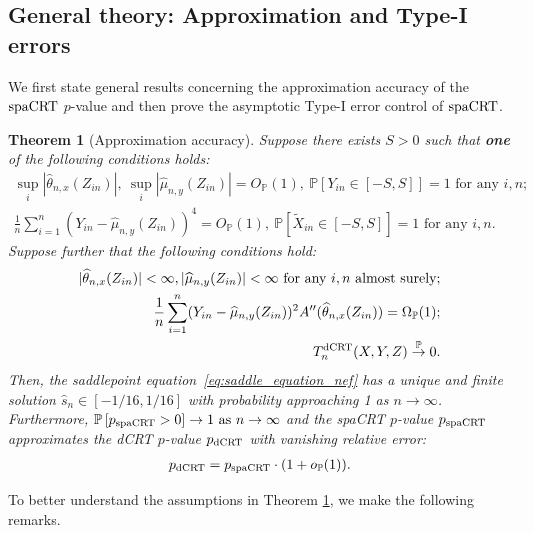 \documentclass[12pt]{article}
\newtheorem{theorem}{Theorem}
\theoremstyle{definition}
\def\P{\mathbb{P}}
\def\P{\mathbb{P}}
\renewcommand{\P}{\mathbb{P}}							%
\newcommand{\convp}{\overset{\mathbb{P}}{\rightarrow}}             %
\newcommand{\srx}{X}									%
\newcommand{\srz}{Z}									%
\newcommand{\srxk}{\widetilde X}						%
\newcommand{\sry}{Y}									%
\newcommand{\dCRT}{\textnormal{dCRT}} 					%
\newcommand{\spacrt}{\textnormal{spaCRT}}               %
\begin{document}
  \subsection{General theory: Approximation and Type-I errors} \label{sec:spacrt-general-theory}
  
  We first state general results concerning the approximation accuracy of the $\spacrt$ $p$-value and then prove the asymptotic Type-I error control of $\spacrt$.
  
  \begin{theorem}[Approximation accuracy]\label{thm:validity_spacrt}
	Suppose there exists $S>0$ such that \textbf{one} of the following conditions holds:
	\begin{align}
	  \sup_{i}|\widehat{\theta}_{n,x}(\srz_{in})|,\ \sup_{i}|\widehat{\mu}_{n,y}(\srz_{in})| = O_{\P}(1),\  \P[\sry_{in}\in [-S,S]]=1\text{ for any }i,n\label{eq:cse_assumption}\tag{CSE};\\
	  \frac{1}{n}\sum_{i=1}^n (\sry_{in}-\widehat{\mu}_{n,y}(\srz_{in}))^4=O_{\P}(1),\ \P\left[\srxk_{in}\in [-S,S]\right]=1\text{ for any }i,n\label{eq:ccs_assumption}\tag{CCS}.
	\end{align}
	  Suppose further that the following conditions hold:
	  \begin{align}
		  |\widehat \theta_{n,x}(\srz_{in})|<\infty,|\widehat \mu_{n,y}(\srz_{in})|<\infty\text{ for any $i,n$ almost surely};\label{eq:upper_bound_theta_a} \\
		  \frac{1}{n}\sum_{i=1}^n (Y_{in}-\widehat{\mu}_{n,y}(Z_{in}))^2 A''(\widehat \theta_{n,x}(\srz_{in}))=\Omega_{\P}(1);\label{eq:lower_bound_spacrt}\\
		  T_n^{\dCRT}(\srx,\sry,\srz)\convp 0\label{eq:x_n_convergence_spacrt}.
	  \end{align}
	  Then, the saddlepoint equation~\eqref{eq:saddle_equation_nef} has a unique and finite solution $\hat s_n \in [-1/16, 1/16]$ with probability approaching 1 as $n \rightarrow \infty$. Furthermore, $\P\left[p_{\spacrt}>0\right]\rightarrow1 \text{ as }n\rightarrow\infty$ and the spaCRT $p$-value $p_{\spacrt}$ approximates the dCRT $p$-value $p_{\dCRT}$ with vanishing relative error:
	  \begin{align}\label{eq:approximation_accuracy_spacrt}
		  p_{\dCRT} = p_{\spacrt}\cdot (1+o_\P(1)).
	  \end{align}
  \end{theorem}
  
  \noindent To better understand the assumptions in Theorem \ref{thm:validity_spacrt}, we make the following remarks.
  
\end{document}
